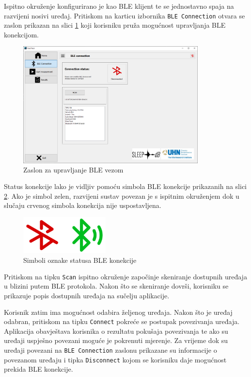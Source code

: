 \documentclass[../diplomski_rad.tex]{subfiles}
\begin{document}
Ispitno okruženje konfigurirano je kao BLE klijent te se jednostavno spaja na razvijeni nosivi uređaj. 
Pritiskom na karticu izbornika \texttt{BLE Connection} otvara se zaslon prikazan na slici \ref{slk:ble} 
koji korisniku pruža mogućnost upravljanja BLE konekcijom.

\begin{figure}[htb]
    \centering
    \includegraphics[width=0.85\textwidth]{Figures/ble.png} 
    \caption{Zaslon za upravljanje BLE vezom}
    \label{slk:ble}
\end{figure}

Status konekcije lako je vidljiv pomoću simbola BLE konekcije prikazanih na slici \ref{slk:ble_status_simboli}.  
Ako je simbol zelen, razvijeni sustav povezan je s ispitnim okruženjem dok u slučaju crvenog simbola konekcija nije uspostavljena.

\begin{figure}[htb]
    \centering
    \includegraphics[width=0.4\textwidth]{Figures/ble_status_simboli.png} 
    \caption{Simboli oznake statusa BLE konekcije \cite{ikone}}
    \label{slk:ble_status_simboli}
\end{figure}

Pritiskom na tipku \texttt{Scan}  ispitno okruženje započinje skeniranje dostupnih uređaja 
u blizini putem BLE protokola. 
Nakon što se skeniranje dovrši, korisniku se prikazuje popis dostupnih uređaja na sučelju aplikacije.

Korisnik zatim ima mogućnost odabira željenog uređaja. Nakon što je uređaj odabran, pritiskom na tipku \texttt{Connect} 
pokreće se postupak povezivanja uređaja. 
Aplikacija obavještava korisnika o rezultatu pokušaja povezivanja te ako su uređaji uspješno povezani moguće je pokrenuti mjerenje.  
Za vrijeme dok su uređaji povezani na \texttt{BLE Connection} zaslonu prikazane su informacije o povezanom uređaju 
i tipka \texttt{Disconnect} kojom se korisniku daje mogućnost prekida BLE konekcije.
\end{document}
